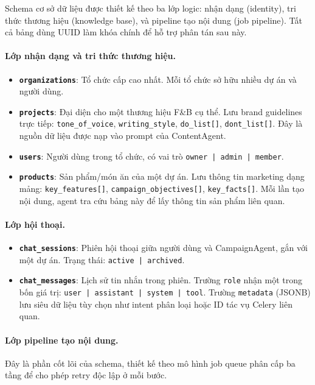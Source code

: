 Schema cơ sở dữ liệu được thiết kế theo ba lớp logic: nhận dạng
(identity), tri thức thương hiệu (knowledge base), và pipeline tạo nội
dung (job pipeline). Tất cả bảng dùng UUID làm khóa chính để hỗ trợ
phân tán sau này.

\paragraph{Lớp nhận dạng và tri thức thương hiệu.}
\begin{itemize}
  \item \textbf{\texttt{organizations}}: Tổ chức cấp cao nhất. Mỗi tổ
    chức sở hữu nhiều dự án và người dùng.
  \item \textbf{\texttt{projects}}: Đại diện cho một thương hiệu F\&B cụ
    thể. Lưu brand guidelines trực tiếp: \texttt{tone\_of\_voice},
    \texttt{writing\_style}, \texttt{do\_list[]},
    \texttt{dont\_list[]}. Đây là nguồn dữ liệu được nạp vào prompt của
    ContentAgent.
  \item \textbf{\texttt{users}}: Người dùng trong tổ chức, có vai trò
    \texttt{owner | admin | member}.
  \item \textbf{\texttt{products}}: Sản phẩm/món ăn của một dự án. Lưu
    thông tin marketing dạng mảng: \texttt{key\_features[]},
    \texttt{campaign\_objectives[]}, \texttt{key\_facts[]}. Mỗi lần tạo
    nội dung, agent tra cứu bảng này để lấy thông tin sản phẩm liên quan.
\end{itemize}

\paragraph{Lớp hội thoại.}
\begin{itemize}
  \item \textbf{\texttt{chat\_sessions}}: Phiên hội thoại giữa người dùng
    và CampaignAgent, gắn với một dự án. Trạng thái:
    \texttt{active | archived}.
  \item \textbf{\texttt{chat\_messages}}: Lịch sử tin nhắn trong phiên.
    Trường \texttt{role} nhận một trong bốn giá trị:
    \texttt{user | assistant | system | tool}. Trường \texttt{metadata}
    (JSONB) lưu siêu dữ liệu tùy chọn như intent phân loại hoặc ID tác
    vụ Celery liên quan.
\end{itemize}

\paragraph{Lớp pipeline tạo nội dung.}
Đây là phần cốt lõi của schema, thiết kế theo mô hình job queue phân cấp
ba tầng để cho phép retry độc lập ở mỗi bước.

